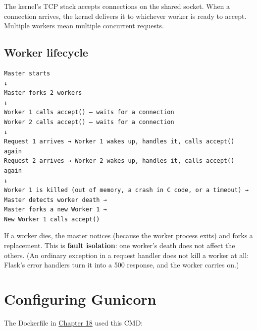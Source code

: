 \noindent{}The kernel's TCP stack accepts connections on the shared socket. When a connection arrives, the kernel delivers it to whichever worker is ready to accept. Multiple workers mean multiple concurrent requests.

\subsection*{Worker lifecycle}\label{24-process-startup:worker-lifecycle}

\begin{outputbox}[short]
\begin{Verbatim}[fontsize=\codesize, breaklines, breakanywhere, breaksymbolleft={\tiny\textcolor{muted}{$\hookrightarrow$}}]
Master starts
↓
Master forks 2 workers
↓
Worker 1 calls accept() — waits for a connection
Worker 2 calls accept() — waits for a connection
↓
Request 1 arrives → Worker 1 wakes up, handles it, calls accept() again
Request 2 arrives → Worker 2 wakes up, handles it, calls accept() again
↓
Worker 1 is killed (out of memory, a crash in C code, or a timeout) →
Master detects worker death →
Master forks a new Worker 1 →
New Worker 1 calls accept()
\end{Verbatim}
\end{outputbox}

\noindent{}If a worker dies, the master notices (because the worker process exits) and forks a replacement. This is \textbf{fault isolation}: one worker's death does not affect the others. (An ordinary exception in a request handler does not kill a worker at all: Flask's error handlers turn it into a 500 response, and the worker carries on.)

\setcounter{section}{2}
\section{Configuring Gunicorn}\label{24-process-startup:243-configuring-gunicorn}

The Dockerfile in \hyperref[ch:18-containerization]{Chapter 18} used this CMD:

